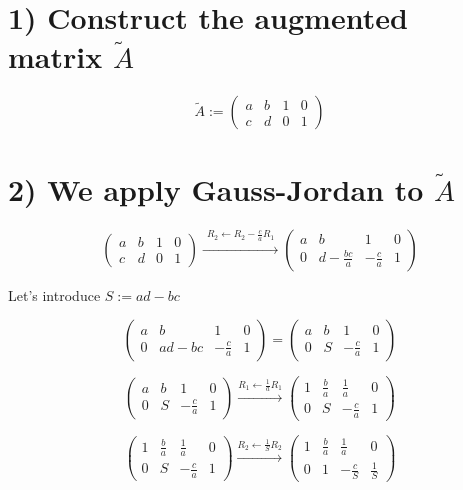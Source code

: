 \section{1) Construct the augmented matrix \(\widetilde{A}\)}
\[\widetilde{A} := \begin{pmatrix}
a & b & 1 & 0 \\
c & d & 0 & 1
\end{pmatrix}\]

\section{2) We apply Gauss-Jordan to \(\widetilde{A}\)}
\[\begin{pmatrix}
a & b & 1 & 0 \\
c & d & 0 & 1
\end{pmatrix} \xrightarrow{\substack{R_2 \leftarrow R_2 - \frac{c}{a}R_1}}
\begin{pmatrix}
a & b & 1 & 0 \\
0 & d-\frac{bc}{a} & -\frac{c}{a} & 1
\end{pmatrix}\]

Let's introduce \(S := ad - bc\)

\[\begin{pmatrix}
a & b & 1 & 0 \\
0 & ad-bc & -\frac{c}{a} & 1
\end{pmatrix} = \begin{pmatrix}
a & b & 1 & 0 \\
0 & S & -\frac{c}{a} & 1
\end{pmatrix}\]

\[\begin{pmatrix}
a & b & 1 & 0 \\
0 & S & -\frac{c}{a} & 1
\end{pmatrix} \xrightarrow{R_1 \leftarrow \frac{1}{a}R_1}
\begin{pmatrix}
1 & \frac{b}{a} & \frac{1}{a} & 0 \\
0 & S & -\frac{c}{a} & 1
\end{pmatrix}\]

\[\begin{pmatrix}
1 & \frac{b}{a} & \frac{1}{a} & 0 \\
0 & S & -\frac{c}{a} & 1
\end{pmatrix} \xrightarrow{R_2 \leftarrow \frac{1}{S}R_2}
\begin{pmatrix}
1 & \frac{b}{a} & \frac{1}{a} & 0 \\
0 & 1 & -\frac{c}{S} & \frac{1}{S}
\end{pmatrix}\]


